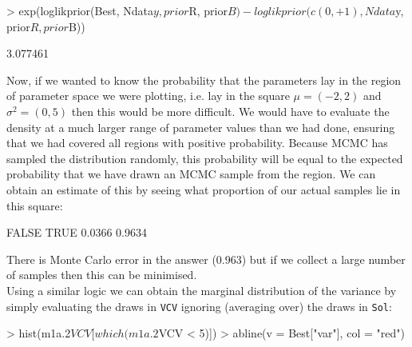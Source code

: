 \documentclass{article}
\begin{document}
\begin{Schunk}
\begin{Sinput}
> exp(loglikprior(Best, Ndata$y, prior$R, prior$B) - loglikprior(c(0, 
+     1), Ndata$y, prior$R, prior$B))
\end{Sinput}
\begin{Soutput}
[1] 3.077461
\end{Soutput}
\end{Schunk}


Now, if we wanted to know the probability that the parameters lay in the region of parameter space we were plotting, i.e. lay in the square $\mu = (-2,2)$ and $\sigma^{2} = (0,5)$ then this would be more difficult. We would have to evaluate the density at a much larger range of parameter values than we had done, ensuring that we had covered all regions with positive probability. Because MCMC has sampled the distribution randomly, this probability will be equal to the expected probability that we have drawn an MCMC sample from the region. We can obtain an estimate of this by seeing what proportion of our actual samples lie in this square:

\begin{Schunk}
\begin{Soutput}
 FALSE   TRUE 
0.0366 0.9634 
\end{Soutput}
\end{Schunk}

There is Monte Carlo error in the answer (0.963) but if we collect a large number of samples then this can be minimised.\\ 

Using a similar logic we can obtain the marginal distribution of the variance by simply evaluating the draws in \texttt{VCV} ignoring (averaging over) the draws in \texttt{Sol}:

\iftalk
\else
\begin{Schunk}
\begin{Sinput}
> hist(m1a.2$VCV[which(m1a.2$VCV < 5)])
> abline(v = Best["var"], col = "red")
\end{Sinput}
\end{Schunk}
\fi
\end{document}
